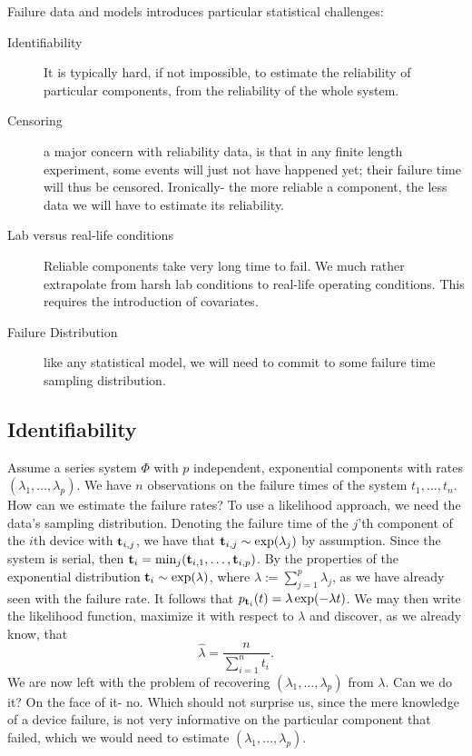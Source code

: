 Failure data and models introduces particular statistical challenges:
\begin{description}
\item [Identifiability] It is typically hard, if not impossible, to estimate the reliability of particular components, from the reliability of the whole system. 
\item [Censoring] a major concern with reliability data, is that in any finite length experiment, some events will just not have happened yet; their failure time will thus be censored. Ironically- the more reliable a component, the less data we will have to estimate its reliability. 
\item [Lab versus real-life conditions] Reliable components take very long time to fail. We much rather extrapolate from harsh lab conditions to real-life operating conditions. This requires the introduction of covariates. 
\item [Failure Distribution] like any statistical model, we will need to commit to some failure time sampling distribution.
\end{description}


\subsection{Identifiability}

\begin{example}
\label{eg:likelihood_of_failures}
Assume a series system $\Phi$ with $p$ independent, exponential components with rates $(\lambda_1,\dots,\lambda_p)$.
We have $n$ observations on the failure times of the system $t_1,\dots,t_n$.
How can we estimate the failure rates?
To use a likelihood approach, we need the data's sampling distribution.
Denoting the failure time of the $j$'th component of the $i$th device with $\mathbf{t}_{i,j}$, we have that $\mathbf{t}_{i,j}\sim \exp(\lambda_j)$ by assumption.
Since the system is serial, then $\mathbf{t}_i=\min_j(\mathbf{t}_{i,1},\dots,\mathbf{t}_{i,p})$.
By the properties of the exponential distribution $\mathbf{t}_i \sim \exp(\lambda)$, where $\lambda:=\sum_{j=1}^{p} \lambda_j$, as we have already seen with the failure rate. It follows that
$p_{\mathbf{t}_i} (t)=\lambda \exp(-\lambda t)$.
We may then write the likelihood function, maximize it with respect to $\lambda$ and discover, as we already know, that $$\hat{\lambda}=\frac{n}{\sum_{i=1}^{n} t_i}.$$
We are now left with the problem of recovering $(\lambda_1,\dots,\lambda_p)$ from $\lambda$. 
Can we do it? On the face of it- no. Which should not surprise us, since the mere knowledge of a device failure, is not very informative on the particular component that failed, which we would need to estimate $(\lambda_1,\dots,\lambda_p)$.
\end{example}

